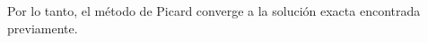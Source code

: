 \documentclass{article}
\theoremstyle{nonumberplain}
\begin{document}
Por lo tanto, el método de Picard converge a la solución exacta encontrada previamente.

\end{document}

